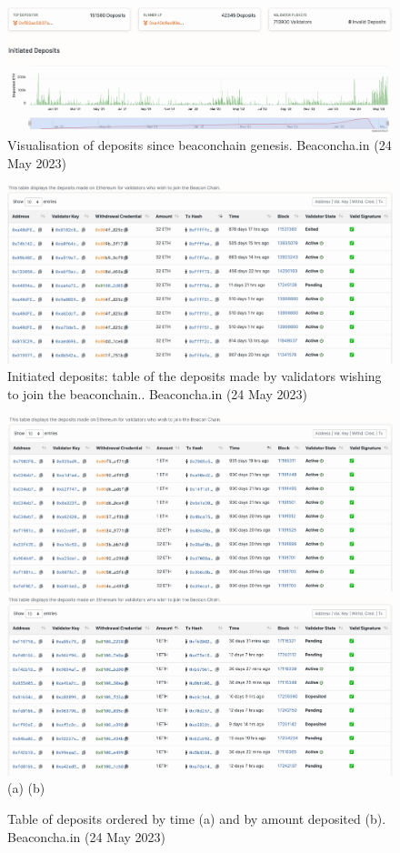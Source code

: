 \documentclass[UTF8]{article}
\begin{document}
\begin{figure}[htbp]
\begin{center}
\includegraphics[width=0.9\linewidth]{images/bdeposits}
\caption{Visualisation of deposits since beaconchain genesis. Beaconcha.in (24 May 2023)}
\label{fig:bdeposits}
\end{center}
\end{figure}

\begin{figure}[htbp]
\begin{center}
\includegraphics[width=0.9\linewidth]{images/bdeposittbl}
\caption{Initiated deposits: table of the deposits made by validators wishing to join the beaconchain.. Beaconcha.in (24 May 2023)}
\label{fig:bdeposittbl}
\end{center}
\end{figure}

\begin{figure}[htbp]
\begin{center}
\includegraphics[width=0.48\linewidth]{images/bdeposittbltime}
\includegraphics[width=0.48\linewidth]{images/bdeposittblamount} \\
(a)\hspace{160pt}        (b)\\
\caption{Table of deposits ordered by time (a) and by amount deposited (b). Beaconcha.in (24 May 2023)}
\label{fig:bdeposittbltime}
\end{center}
\end{figure}
\end{document}
